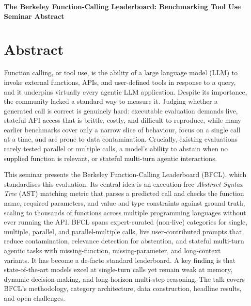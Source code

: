 \documentclass[11pt]{article}
\begin{document}
\begin{center}
{\LARGE\bfseries The Berkeley Function-Calling Leaderboard: Benchmarking Tool Use}\\[1.1em]
{\large\bfseries Seminar Abstract}\\[0.6em]
{\normalsize \seminarDate}
\end{center}
\vspace{0.6em}
\section*{Abstract}
Function calling, or tool use, is the ability of a large language model (LLM) to invoke external functions, APIs, and user-defined tools in response to a query, and it underpins virtually every agentic LLM application. Despite its importance, the community lacked a standard way to measure it. Judging whether a generated call is correct is genuinely hard: executable evaluation demands live, stateful API access that is brittle, costly, and difficult to reproduce, while many earlier benchmarks cover only a narrow slice of behaviour, focus on a single call at a time, and are prone to data contamination. Crucially, existing evaluations rarely tested parallel or multiple calls, a model's ability to abstain when no supplied function is relevant, or stateful multi-turn agentic interactions.

This seminar presents the Berkeley Function-Calling Leaderboard (BFCL), which standardises this evaluation. Its central idea is an execution-free \emph{Abstract Syntax Tree} (AST) matching metric that parses a predicted call and checks the function name, required parameters, and value and type constraints against ground truth, scaling to thousands of functions across multiple programming languages without ever running the API. BFCL spans expert-curated (non-live) categories for single, multiple, parallel, and parallel-multiple calls, live user-contributed prompts that reduce contamination, relevance detection for abstention, and stateful multi-turn agentic tasks with missing-function, missing-parameter, and long-context variants. It has become a de-facto standard leaderboard. A key finding is that state-of-the-art models excel at single-turn calls yet remain weak at memory, dynamic decision-making, and long-horizon multi-step reasoning. The talk covers BFCL's methodology, category architecture, data construction, headline results, and open challenges.
\end{document}
